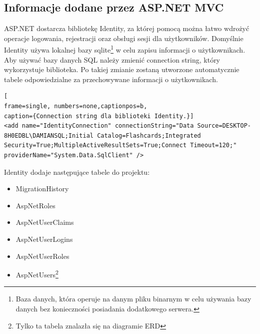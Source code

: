 \subsection{Informacje dodane przez ASP.NET MVC}

ASP.NET dostarcza bibliotekę Identity, za której pomocą można łatwo wdrożyć operacje logowania, rejestracji oraz obsługi sesji dla użytkowników. Domyślnie Identity używa lokalnej bazy sqlite\footnote{Baza danych, która operuje na danym pliku binarnym w celu używania bazy danych bez konieczności posiadania dodatkowego serwera.} w celu zapisu informacji o użytkownikach. Aby używać bazy danych SQL należy zmienić connection string, który wykorzystuje biblioteka. Po takiej zmianie zostaną utworzone automatycznie tabele odpowiedzialne za przechowywane informacji o użytkownikach.

\begin{minipage}{\linewidth}
\begin{lstlisting}[
frame=single, numbers=none,captionpos=b, 
caption={Connection string dla biblioteki Identity.}]
<add name="IdentityConnection" connectionString="Data Source=DESKTOP-8H0EDBL\DAMIANSQL;Initial Catalog=Flashcards;Integrated Security=True;MultipleActiveResultSets=True;Connect Timeout=120;" providerName="System.Data.SqlClient" />

\end{lstlisting}
\end{minipage}

Identity dodaje następujące tabele do projektu:
\begin{itemize}
	\item \textunderscore\textunderscore MigrationHistory
	\item AspNetRoles
	\item AspNetUserClaims
	\item AspNetUserLogins
	\item AspNetUserRoles
	\item AspNetUsers\footnote{Tylko ta tabela znalazła się na diagramie ERD}
\end{itemize}

